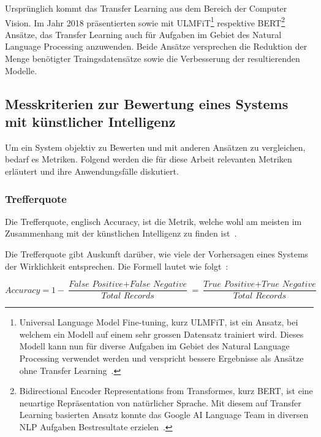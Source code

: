 Ursprünglich kommt das Transfer Learning aus dem Bereich der Computer Vision. Im Jahr 2018 präsentierten \textcite{Howard2018} sowie \textcite{Devlin2018} mit ULMFiT\footnote{Universal Language Model Fine-tuning, kurz ULMFiT, ist ein Ansatz, bei welchem ein Modell auf einem sehr grossen Datensatz trainiert wird. Dieses Modell kann nun für diverse Aufgaben im Gebiet des Natural Language Processing verwendet werden und verspricht bessere Ergebnisse als Ansätze ohne Transfer Learning~\autocite{Howard2018}.} respektive BERT\footnote{Bidirectional Encoder Representations from Transformes, kurz BERT, ist eine neuartige Repräsentation von natürlicher Sprache. Mit diesem auf Transfer Learning basierten Ansatz konnte das Google AI Language Team in diversen NLP Aufgaben Bestresultate erzielen~\autocite{Devlin2018}.} Ansätze, das Transfer Learning auch für Aufgaben im Gebiet des Natural Language Processing anzuwenden. Beide Ansätze versprechen die Reduktion der Menge benötigter Traingsdatensätze sowie die Verbesserung der resultierenden Modelle.

\newpage
\subsection{Messkriterien zur Bewertung eines Systems mit künstlicher Intelligenz}
\label{chap:metrices}

Um ein System objektiv zu Bewerten und mit anderen Ansätzen zu vergleichen, bedarf es Metriken. Folgend werden die für diese Arbeit relevanten Metriken erläutert und ihre Anwendungsfälle diskutiert.

\subsubsection{Trefferquote}

Die Trefferquote, englisch Accuracy, ist die Metrik, welche wohl am meisten im Zusammenhang mit der künstlichen Intelligenz zu finden ist~\autocite{TDSAccuracy}.

Die Trefferquote gibt Auskunft darüber, wie viele der Vorhersagen eines Systems der Wirklichkeit entsprechen. Die Formell lautet wie folgt~\autocite{TDSAccuracy}: 

\nopagebreak
$$\textit{Accuracy} = 1 - \frac{\textit{False Positive} + \textit{False Negative}}{\textit{Total Records}} = \frac{\textit{True Positive} + \textit{True Negative}}{\textit{Total Records}}$$
\vspace*{0.2cm}

